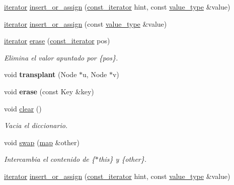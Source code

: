 \begin{DoxyCompactItemize}
\item 
\hyperlink{classaed2_1_1map_1_1iterator}{iterator} \hyperlink{classaed2_1_1map_a2ef6723c183916276b0afc4a4c721475}{insert\+\_\+or\+\_\+assign} (\hyperlink{classaed2_1_1map_1_1const__iterator}{const\+\_\+iterator} hint, const \hyperlink{classaed2_1_1map_a719db98e0ff9a837610f76be33264680}{value\+\_\+type} \&value)
\item 
\hyperlink{classaed2_1_1map_1_1iterator}{iterator} \hyperlink{classaed2_1_1map_a9128a806713bcc999ebd8a97ab77e765}{insert\+\_\+or\+\_\+assign} (const \hyperlink{classaed2_1_1map_a719db98e0ff9a837610f76be33264680}{value\+\_\+type} \&value)
\item 
\hyperlink{classaed2_1_1map_1_1iterator}{iterator} \hyperlink{classaed2_1_1map_ad8e796bf9c9c558e5ce6b61e116253fe}{erase} (\hyperlink{classaed2_1_1map_1_1const__iterator}{const\+\_\+iterator} pos)
\begin{DoxyCompactList}\small\item\em Elimina el valor apuntado por \{pos\}. \end{DoxyCompactList}\item 
\mbox{\label{classaed2_1_1map_a98b9f200c64ce02dfb67902ee00e375a}} 
void {\bfseries transplant} (Node $\ast$u, Node $\ast$v)
\item 
\mbox{\label{classaed2_1_1map_a2ffadb42cd5f0bc7b3752ff159b75334}} 
void {\bfseries erase} (const Key \&key)
\item 
void \hyperlink{classaed2_1_1map_a2bfa5165825979bf2431db55bc6bc9ca}{clear} ()
\begin{DoxyCompactList}\small\item\em Vacia el diccionario. \end{DoxyCompactList}\item 
void \hyperlink{classaed2_1_1map_a43ddb71cc91e5c6021a7a1f243d6cc4a}{swap} (\hyperlink{classaed2_1_1map}{map} \&other)
\begin{DoxyCompactList}\small\item\em Intercambia el contenido de \{$\ast$this\} y \{other\}. \end{DoxyCompactList}\item 
\hyperlink{classaed2_1_1map_1_1iterator}{iterator} \hyperlink{classaed2_1_1map_a2ef6723c183916276b0afc4a4c721475}{insert\+\_\+or\+\_\+assign} (\hyperlink{classaed2_1_1map_1_1const__iterator}{const\+\_\+iterator} hint, const \hyperlink{classaed2_1_1map_a719db98e0ff9a837610f76be33264680}{value\+\_\+type} \&value)

\end{DoxyCompactItemize}
